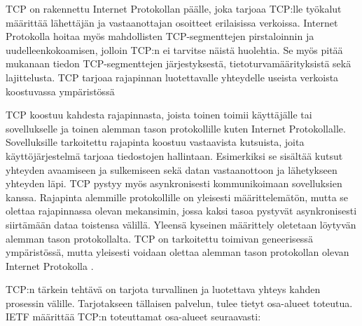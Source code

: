 \documentclass[utf8]{gradu3}
\begin{document}
TCP on rakennettu Internet Protokollan päälle, joka tarjoaa TCP:lle työkalut määrittää lähettäjän ja vastaanottajan osoitteet erilaisissa verkoissa. Internet Protokolla hoitaa myös mahdollisten TCP-segmenttejen pirstaloinnin ja uudelleenkokoamisen, jolloin TCP:n ei tarvitse näistä huolehtia. Se myös pitää mukanaan tiedon TCP-segmenttejen järjestyksestä, tietoturvamäärityksistä sekä lajittelusta. TCP tarjoaa rajapinnan luotettavalle yhteydelle useista verkoista koostuvassa ympäristössä \parencite{tcp1_1} 

TCP koostuu kahdesta rajapinnasta, joista toinen toimii käyttäjälle tai sovellukselle ja toinen alemman tason protokollille kuten Internet Protokollalle. Sovelluksille tarkoitettu rajapinta koostuu vastaavista kutsuista, joita käyttöjärjestelmä tarjoaa tiedostojen hallintaan. Esimerkiksi se sisältää kutsut yhteyden avaamiseen ja sulkemiseen sekä datan vastaanottoon ja lähetykseen yhteyden läpi. TCP pystyy myös asynkronisesti kommunikoimaan sovelluksien kanssa. Rajapinta alemmille protokollille on yleisesti määrittelemätön, mutta se olettaa rajapinnassa olevan mekansimin, jossa kaksi tasoa pystyvät asynkronisesti siirtämään dataa toistensa välillä. Yleensä kyseinen määrittely oletetaan löytyvän alemman tason protokollalta. TCP on tarkoitettu toimivan geneerisessä ympäristössä, mutta yleisesti voidaan olettaa alemman tason protokollan olevan Internet Protokolla \parencite{tcp1_4}.

TCP:n tärkein tehtävä on tarjota turvallinen ja luotettava yhteys kahden prosessin välille. Tarjotakseen tällaisen palvelun, tulee tietyt osa-alueet toteutua. IETF \parencite{tcp1_4}  määrittää TCP:n toteuttamat osa-alueet seuraavasti:
\end{document}

